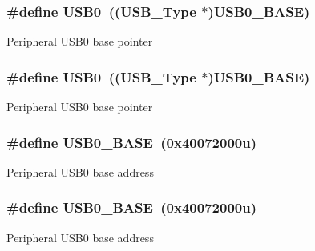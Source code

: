 \subsubsection[{\texorpdfstring{U\+S\+B0}{USB0}}]{\setlength{\rightskip}{0pt plus 5cm}\#define U\+S\+B0~(({\bf U\+S\+B\+\_\+\+Type} $\ast$){\bf U\+S\+B0\+\_\+\+B\+A\+SE})}\hypertarget{group__USB__Peripheral__Access__Layer_gaea56c015ce8ad0cc88464060fde6d87c}{}\label{group__USB__Peripheral__Access__Layer_gaea56c015ce8ad0cc88464060fde6d87c}
Peripheral U\+S\+B0 base pointer 
\subsubsection[{\texorpdfstring{U\+S\+B0}{USB0}}]{\setlength{\rightskip}{0pt plus 5cm}\#define U\+S\+B0~(({\bf U\+S\+B\+\_\+\+Type} $\ast$){\bf U\+S\+B0\+\_\+\+B\+A\+SE})}\hypertarget{group__USB__Peripheral__Access__Layer_gaea56c015ce8ad0cc88464060fde6d87c}{}\label{group__USB__Peripheral__Access__Layer_gaea56c015ce8ad0cc88464060fde6d87c}
Peripheral U\+S\+B0 base pointer 
\subsubsection[{\texorpdfstring{U\+S\+B0\+\_\+\+B\+A\+SE}{USB0_BASE}}]{\setlength{\rightskip}{0pt plus 5cm}\#define U\+S\+B0\+\_\+\+B\+A\+SE~(0x40072000u)}\hypertarget{group__USB__Peripheral__Access__Layer_gaa47acf4992407a85e79d911ca1055d17}{}\label{group__USB__Peripheral__Access__Layer_gaa47acf4992407a85e79d911ca1055d17}
Peripheral U\+S\+B0 base address 
\subsubsection[{\texorpdfstring{U\+S\+B0\+\_\+\+B\+A\+SE}{USB0_BASE}}]{\setlength{\rightskip}{0pt plus 5cm}\#define U\+S\+B0\+\_\+\+B\+A\+SE~(0x40072000u)}\hypertarget{group__USB__Peripheral__Access__Layer_gaa47acf4992407a85e79d911ca1055d17}{}\label{group__USB__Peripheral__Access__Layer_gaa47acf4992407a85e79d911ca1055d17}
Peripheral U\+S\+B0 base address 

